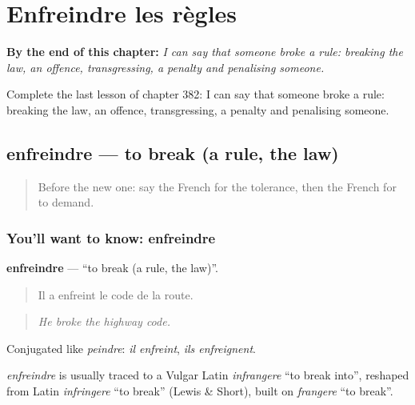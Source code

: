
\chapter{Enfreindre les règles}
\label{ch:fr-enfreindre-les-regles}

\begin{chapteropening}
\textbf{By the end of this chapter:} \emph{I can say that someone broke a rule: breaking the law, an offence, transgressing, a penalty and penalising someone.}

Complete the last lesson of chapter 382: I can say that someone broke a rule: breaking the law, an offence, transgressing, a penalty and penalising someone.
\end{chapteropening}

\section[enfreindre]{enfreindre — to break (a rule, the law)}

\label{lesson:FR-C382-enfreindre}



\begin{quote}
Before the new one: say the French for the tolerance, then the French for to demand.
\end{quote}

\subsection*{You'll want to know: enfreindre}
\textbf{enfreindre} — \textquotedblleft{}to break (a rule, the law)\textquotedblright{}.

\begin{quote}
Il a enfreint le code de la route.
\end{quote}

\begin{quote}
\emph{He broke the highway code.}
\end{quote}

Conjugated like \emph{peindre}: \emph{il enfreint}, \emph{ils enfreignent}.

\begin{cousinweb}
\emph{enfreindre} is usually traced to a Vulgar Latin \emph{infrangere} \textquotedblleft{}to break into\textquotedblright{}, reshaped from Latin \emph{infringere} \textquotedblleft{}to break\textquotedblright{} (Lewis \& Short), built on \emph{frangere} \textquotedblleft{}to break\textquotedblright{}.
\end{cousinweb}

